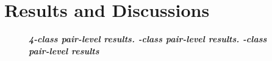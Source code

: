 \section{Results and Discussions}
\label{sec:results}

\begin{figure}
	\centering
	\textbf{\em  4-class pair-level results. \quad\quad {}-class pair-level results.    \quad      \quad{}-class pair-level results}\vspace{-1.0cm}\\
\end{figure}
